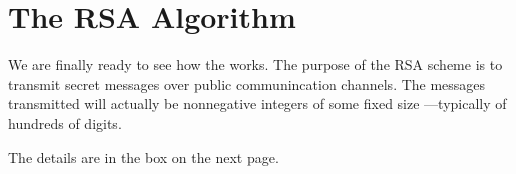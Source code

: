 \begin{problems}
\practiceproblems {} 
 

\classproblems {} 

\homeworkproblems {}

\examproblems {} 
 
\end{problems}

\section{The RSA Algorithm}\label{RSA_sec}
We are finally ready to see how the  works.  The
purpose of the RSA scheme is to transmit secret messages over public communincation
channels.  The messages transmitted will actually be nonnegative integers of some fixed
size ---typically of hundreds of digits.

The details are in the box on the next page.

